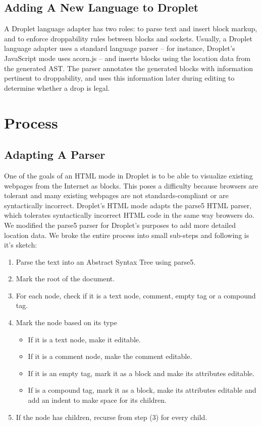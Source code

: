\documentclass[conference]{IEEEtran}
\begin{document}
\subsection{Adding A New Language to Droplet}

A Droplet language adapter has two roles: to parse text and insert block markup, and to enforce droppability rules between blocks and sockets. Usually, a Droplet language adapter uses a standard language parser -- for instance, Droplet's JavaScript mode uses acorn.js -- and inserts blocks using the location data from the generated AST. The parser annotates the generated blocks with information pertinent to droppability, and uses this information later during editing to determine whether a drop is legal.

\section{Process}

\subsection{Adapting A Parser}
One of the goals of an HTML mode in Droplet is to be able to visualize existing webpages from the Internet as blocks. This poses a difficulty because browsers are tolerant and many existing webpages are not standards-compliant or are syntactically incorrect. Droplet's HTML mode adapts the parse5 \cite{parse5} HTML parser, which tolerates syntactically incorrect HTML code in the same way browsers do. We modified the parse5 parser for Droplet's purposes to add more detailed location data. We broke the entire process into small sub-steps and following is it's sketch:
\begin{enumerate}
  \item Parse the text into an Abstract Syntax Tree using parse5.
  \item Mark the root of the document.
  \item For each node, check if it is a text node, comment, empty tag or a compound tag.
  \item Mark the node based on its type
  \begin{itemize}
    \item If it is a text node, make it editable.
    \item If it is a comment node, make the comment editable.
    \item If it is an empty tag, mark it as a block and make its attributes editable.
    \item If is a compound tag, mark it as a block, make its attributes editable and add an indent to make space for its children.
  \end{itemize}
  \item If the node has children, recurse from step (3) for every child.
\end{enumerate}
\end{document}
